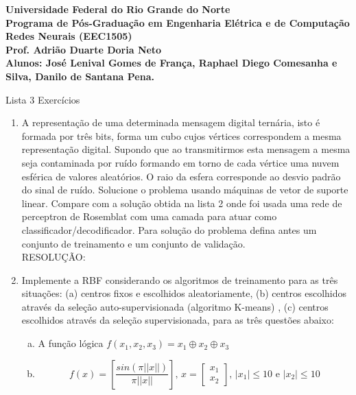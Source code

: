 \documentclass[a4paper,oneside,12pt]{article}
\begin{document}
\bfseries
\noindent
Universidade Federal do Rio Grande do Norte \\
Programa de P\'os-Gradua\c{c}\~ao em Engenharia El\'etrica e de Computa\c{c}\~ao \\
Redes Neurais (EEC1505) \\
Prof. Adri\~ao Duarte Doria Neto \\
Alunos: Jos\'e Lenival Gomes de Fran\c{c}a, Raphael Diego Comesanha e Silva, Danilo de Santana Pena.
\mdseries

\begin{center}
Lista 3 Exerc\'icios
\end{center}

\begin{enumerate}[1.]
\item A representa\c{c}\~ao de uma determinada mensagem digital tern\'aria, isto \'e formada por tr\^es bits, forma um cubo cujos v\'ertices correspondem a mesma representa\c{c}\~ao digital. Supondo que ao transmitirmos esta mensagem a mesma seja contaminada por ru\'ido formando em torno de cada v\'ertice uma nuvem esf\'erica de valores aleat\'orios. O raio da esfera corresponde ao desvio padr\~ao do sinal de ru\'ido. Solucione o problema usando m\'aquinas de vetor de suporte linear. Compare com a solu\c{c}\~ao obtida na lista 2 onde foi usada uma rede de perceptron de Rosemblat com uma camada para atuar como classificador/decodificador. Para solu\c{c}\~ao do problema defina antes um conjunto de treinamento e um conjunto de valida\c{c}\~ao. \\

RESOLU\c{C}\~AO: \\

\item Implemente a RBF considerando os algoritmos de treinamento para as tr\^{e}s situa\c{c}\~oes: (a) centros fixos e escolhidos aleatoriamente, (b) centros escolhidos atrav\'es da sele\c{c}\~ao auto-supervisionada (algoritmo K-means) , (c) centros escolhidos atrav\'es da sele\c{c}\~ao supervisionada, para as tr\^es quest\~oes abaixo: \\

\begin{enumerate}[a)]
\item A fun\c{c}\~ao l\'ogica $f(x_{1}, x_{2}, x_{3}) = x_{1} \oplus x_{2} \oplus x_{3}$

\item \begin{equation*}
f(x) = \left[ \frac{sin(\pi ||x||)}{\pi ||x||} \right] \text{, } x = \begin{bmatrix}
x_{1} \\
x_{2}
\end{bmatrix} \text{, } |x_{1}| \leq 10 \text{ e } |x_{2}| \leq 10
\end{equation*}


\end{enumerate}
\end{enumerate}
\end{document}
